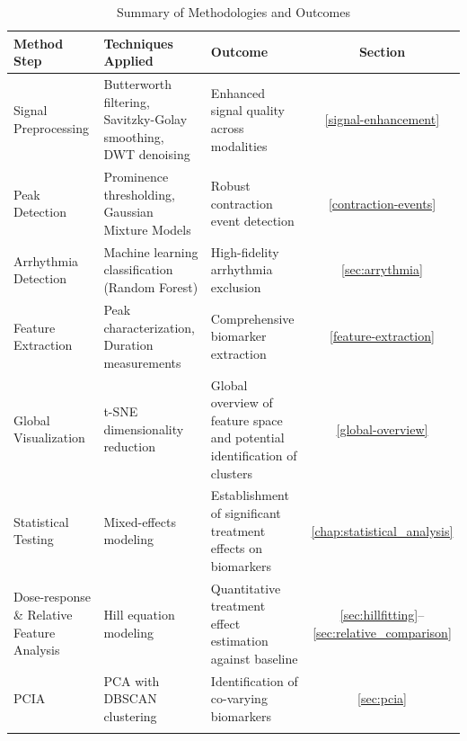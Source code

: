 \documentclass{report}
\begin{document}
    \begin{table}[htbp]
    \centering
    \caption{Summary of Methodologies and Outcomes}
    \label{tab:methods-summary}
    \renewcommand{\arraystretch}{1.4}
    \begin{tabularx}{\textwidth}{@{}>{\raggedright}p{3.5cm}>{\raggedright}p{4.8cm}>{\raggedright}p{3.9cm}c@{}}
        \toprule
        \textbf{Method Step} & \textbf{Techniques Applied} & \textbf{Outcome} & \textbf{Section} \\
        \midrule \addlinespace[5pt]
        
        Signal Preprocessing & Butterworth filtering, Savitzky-Golay smoothing, DWT denoising & 
        Enhanced signal quality across modalities & \ref{signal-enhancement} \\ \addlinespace[5pt]
        
        Peak Detection & Prominence thresholding, Gaussian Mixture Models & 
        Robust contraction event detection & \ref{contraction-events} \\ \addlinespace[5pt]
        
        Arrhythmia Detection & Machine learning classification (Random Forest) & 
        High-fidelity arrhythmia exclusion & \ref{sec:arrythmia} \\ \addlinespace[5pt]
        
        Feature Extraction & Peak characterization, Duration measurements & 
        Comprehensive biomarker extraction & \ref{feature-extraction} \\ \addlinespace[5pt]
        
        Global Visualization & t-SNE dimensionality reduction & 
        Global overview of feature space and potential identification of clusters & \ref{global-overview} \\ \addlinespace[5pt]
        
        Statistical Testing & Mixed-effects modeling & 
        Establishment of significant treatment effects on biomarkers & \ref{chap:statistical_analysis} \\ \addlinespace[5pt]
        
        Dose-response \& Relative Feature Analysis & Hill equation modeling & 
        Quantitative treatment effect estimation against baseline & \ref{sec:hillfitting}--\ref{sec:relative_comparison} \\ \addlinespace[5pt]
        
        PCIA & PCA with DBSCAN clustering & 
        Identification of co-varying biomarkers & \ref{sec:pcia} \\ \addlinespace[5pt]
        

\end{tabularx}
\end{table}
\end{document}
